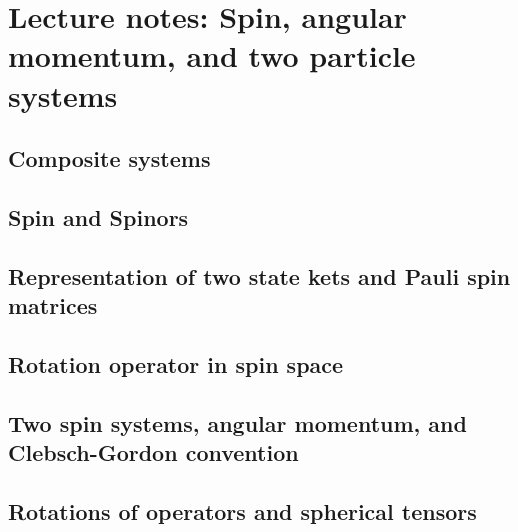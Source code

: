 \part{Lecture notes: Spin, angular momentum, and two particle systems}

   \chapter{Composite systems}
      
   \chapter{Spin and Spinors}
      
      
   \chapter{Representation of two state kets and Pauli spin matrices}
      
   \chapter{Rotation operator in spin space}
      
      
   \chapter{Two spin systems, angular momentum, and Clebsch-Gordon convention}
      
      
      
   \chapter{Rotations of operators and spherical tensors}
      
      


